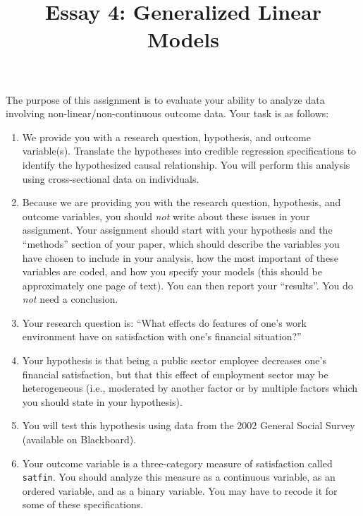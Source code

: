 \documentclass[a4paper,11pt]{article}
\title{Essay 4: Generalized Linear Models}
\author{}
\date{}
\begin{document}
\maketitle

\vspace{-3em}


\vspace{1em}

\noindent The purpose of this assignment is to evaluate your ability to analyze data involving non-linear/non-continuous outcome data. Your task is as follows:
\begin{enumerate}\itemsep1em
\item We provide you with a research question, hypothesis, and outcome variable(s). Translate the hypotheses into credible regression specifications to identify the hypothesized causal relationship. You will perform this analysis using cross-sectional data on individuals. 

\item Because we are providing you with the research question, hypothesis, and outcome variables, you should \textit{not} write about these issues in your assignment. Your assignment should start with your hypothesis and the ``methods'' section of your paper, which should describe the variables you have chosen to include in your analysis, how the most important of these variables are coded, and how you specify your models (this should be approximately one page of text). You can then report your ``results''. You do \textit{not} need a conclusion.

\item Your research question is: ``What effects do features of one's work environment have on satisfaction with one's financial situation?''

\item Your hypothesis is that being a public sector employee decreases one's financial satisfaction, but that this effect of employment sector may be heterogeneous (i.e., moderated by another factor or by multiple factors which you should state in your hypothesis).

\item You will test this hypothesis using data from the 2002 General Social Survey (available on Blackboard).

\item Your outcome variable is a three-category measure of satisfaction called \texttt{satfin}. You should analyze this measure as a continuous variable, as an ordered variable, and as a binary variable. You may have to recode it for some of these specifications.


\end{enumerate}
\end{document}

